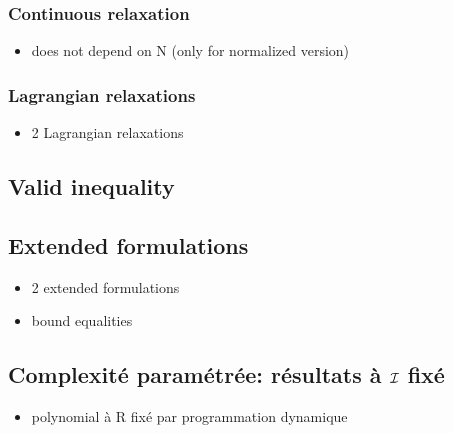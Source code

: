 \subsubsection{Continuous relaxation}

\begin{itemize}
  \item does not depend on N (only for normalized version)
\end{itemize}

\subsubsection{Lagrangian relaxations}

\begin{itemize}
  \item 2 Lagrangian relaxations
\end{itemize}


\subsection{Valid inequality}


\subsection{Extended formulations}

\begin{itemize}
  \item 2 extended formulations
  \item bound equalities
\end{itemize}


\subsection{Complexité paramétrée: résultats à $\mathcal{I}$ fixé}


\begin{itemize}
  \item polynomial à R fixé par programmation dynamique
\end{itemize}
